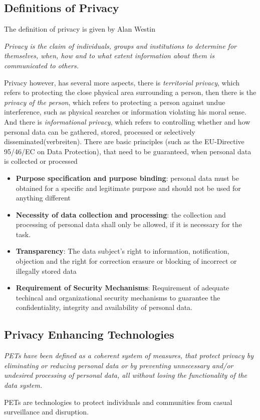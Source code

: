 \documentclass[a4paper, 10 pt, conference]{ieeeconf}
\begin{document}
\subsection{\textbf{Definitions of Privacy}}
The definition of privacy  is given by Alan Westin
\begin{center}
\textit{Privacy is the claim of individuals, groups and institutions to determine for themselves, when, how and to what extent information about them is communicated to others. }
\end{center}
Privacy however, has several more aspects, there is \emph{territorial privacy}, which refers to protecting the close physical area surrounding a person, then there is the \emph{privacy of the person}, which refers to protecting a person against undue interference, such as physical searches or information violating his moral sense. And there is \emph{informational privacy}, which refers to controlling whether and how personal data can be gathered, stored, processed or selectively disseminated(verbreiten). 
There are basic principles (such as the EU-Directive 95/46/EC on Data Protection), that need to be guaranteed, when personal data is collected or processed
\begin{itemize}
\item \textbf{Purpose specification and purpose binding}: personal data must be obtained for a specific and legitimate purpose and should not be used for anything different
\item \textbf{Necessity of data collection and processing}: the collection and processing of personal data shall only be allowed, if it is necessary for the task.
\item \textbf{Transparency}: The data subject's right to information, notification, objection and the right for correction erasure or blocking of incorrect or illegally stored data
\item \textbf{Requirement of Security Mechanisms}: Requirement of adequate techincal and organizational security mechanisms to guarantee the confidentiality, integrity and availability of personal data. 
\end{itemize}

\subsection{\textbf{Privacy Enhancing Technologies}}
\begin{center}
\textit{PETs have been defined as a coherent system of measures, that protect privacy by eliminating or reducing personal data or by preventing unnecessary and/or undesired processing of personal data, all without losing the functionality of the data system.}
\end{center}
PETs are technologies to protect individuals and communities from casual surveillance and disruption. 
\vspace{0.5cm}
\end{document}
